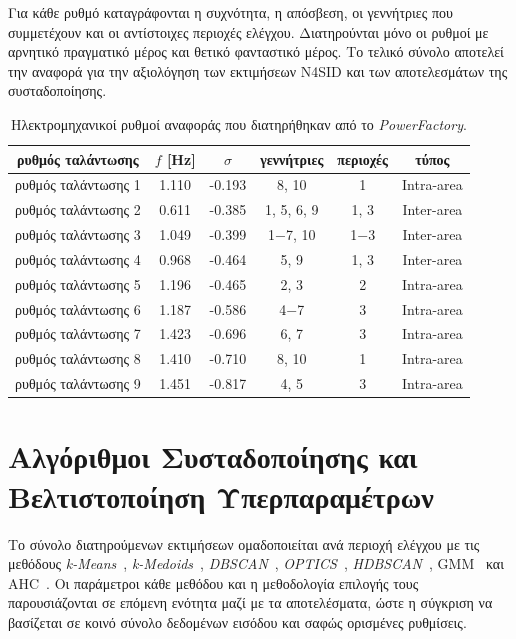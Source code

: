 Για κάθε ρυθμό καταγράφονται η συχνότητα, η απόσβεση, οι γεννήτριες που συμμετέχουν και οι αντίστοιχες περιοχές ελέγχου. Διατηρούνται μόνο οι ρυθμοί με αρνητικό πραγματικό μέρος και θετικό φανταστικό μέρος. Το τελικό σύνολο αποτελεί την αναφορά για την αξιολόγηση των εκτιμήσεων N4SID και των αποτελεσμάτων της συσταδοποίησης.

\begin{table}[htbp]
    \centering
    \caption{Ηλεκτρομηχανικοί ρυθμοί αναφοράς που διατηρήθηκαν από το \textenglish{\textit{PowerFactory}}.}
    \label{tab:amb:pf_reference_modes}
    \begin{tabular}{cccccc}
        \toprule
        \textbf{ρυθμός ταλάντωσης} & \textbf{$f$ [Hz]} & \textbf{$\sigma$} & \textbf{γεννήτριες} & \textbf{περιοχές} & \textbf{τύπος} \\
        \midrule
        ρυθμός ταλάντωσης 1 & 1.110 & -0.193 & 8, 10& 1 & Intra-area \\
        ρυθμός ταλάντωσης 2 & 0.611 & -0.385 & 1, 5, 6, 9 & 1, 3 & Inter-area \\
        ρυθμός ταλάντωσης 3 & 1.049 & -0.399 & 1$-$7, 10 & 1$-$3 & Inter-area \\
        ρυθμός ταλάντωσης 4 & 0.968 & -0.464 & 5, 9 & 1, 3 & Inter-area \\
        ρυθμός ταλάντωσης 5 & 1.196 & -0.465 & 2, 3 & 2 & Intra-area \\
        ρυθμός ταλάντωσης 6 & 1.187 & -0.586 & 4$-$7 & 3 & Intra-area \\
        ρυθμός ταλάντωσης 7 & 1.423 & -0.696 & 6, 7 & 3 & Intra-area \\
        ρυθμός ταλάντωσης 8 & 1.410 & -0.710 & 8, 10 & 1 & Intra-area \\
        ρυθμός ταλάντωσης 9 & 1.451 & -0.817 & 4, 5 & 3 & Intra-area \\
        \bottomrule
    \end{tabular}
\end{table}

\section{Αλγόριθμοι Συσταδοποίησης και Βελτιστοποίηση Υπερπαραμέτρων}

Το σύνολο διατηρούμενων εκτιμήσεων ομαδοποιείται ανά περιοχή ελέγχου με τις μεθόδους \textenglish{\textit{k-Means}}~\cite{macqueen1967some}, \textenglish{\textit{k-Medoids}}~\cite{kaufman2009finding}, \textenglish{\textit{DBSCAN}}~\cite{dbscan1996}, \textenglish{\textit{OPTICS}}~\cite{optics1999}, \textenglish{\textit{HDBSCAN}}~\cite{hdbscan2015}, \textenglish{GMM}~\cite{gmm2002} και AHC~\cite{agglomerative1963}. Οι παράμετροι κάθε μεθόδου και η μεθοδολογία επιλογής τους παρουσιάζονται σε επόμενη ενότητα μαζί με τα αποτελέσματα, ώστε η σύγκριση να βασίζεται σε κοινό σύνολο δεδομένων εισόδου και σαφώς ορισμένες ρυθμίσεις.

